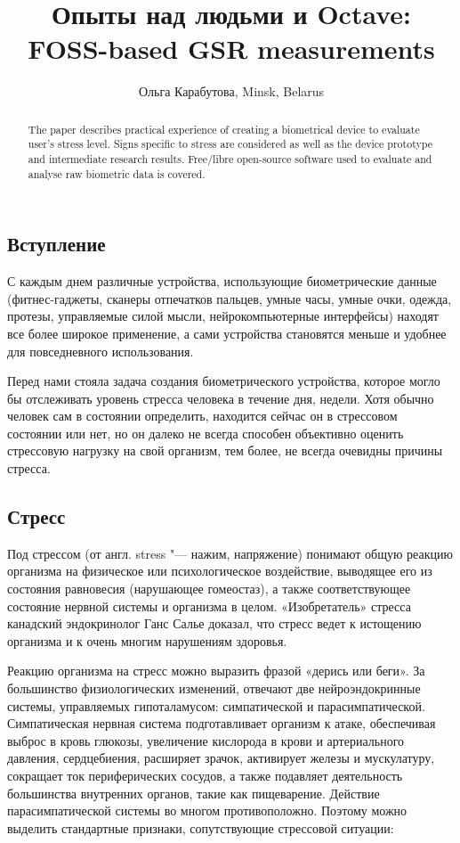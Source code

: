 \documentclass[10pt, a5paper]{article}
\begin{document}
\title{Опыты над людьми и Octave: FOSS-based GSR measurements}
\author{Ольга Карабутова, Minsk, Belarus}
\maketitle
\begin{abstract}
The paper describes practical experience of creating a biometrical device to evaluate user’s stress level. Signs specific to stress are considered as well as the device prototype and intermediate research results. Free/libre open-source software used to evaluate and analyse raw biometric data is covered.
\end{abstract}
\subsection*{Вступление}

С каждым днем различные устройства, использующие биометрические данные (фитнес-гаджеты, сканеры отпечатков пальцев, умные часы, умные очки, одежда, протезы, управляемые силой мысли, нейрокомпьютерные интерфейсы) находят все более широкое применение, а сами устройства становятся меньше и удобнее для повседневного использования.

Перед нами стояла задача  создания биометрического устройства, которое могло бы отслеживать уровень стресса  человека в течение дня, недели.  Хотя обычно человек сам в состоянии определить, находится сейчас он в стрессовом состоянии или нет, но он далеко не всегда способен объективно оценить стрессовую  нагрузку на свой организм, тем более, не всегда очевидны причины стресса.

\subsection*{Стресс}

Под стрессом (от англ. stress "--- нажим, напряжение) понимают общую реакцию организма на физическое или психологическое воздействие, выводящее его из состояния равновесия (нарушающее гомеостаз), а также соответствующее состояние нервной системы и организма в целом.
«Изобретатель» стресса канадский эндокринолог Ганс Салье доказал, что стресс ведет к истощению организма и к очень многим нарушениям здоровья.

Реакцию организма на стресс можно выразить фразой «дерись или беги». За большинство физиологических изменений, отвечают две нейроэндокринные системы, управляемых гипоталамусом: симпатической и парасимпатической. Симпатическая нервная система подготавливает организм к атаке, обеспечивая выброс в кровь глюкозы, увеличение кислорода в крови и артериального давления, сердцебиения, расширяет зрачок, активирует железы и мускулатуру, сокращает ток периферических сосудов, а также подавляет деятельность большинства внутренних органов, такие как пищеварение. Действие парасимпатической системы во многом противоположно. Поэтому можно выделить стандартные признаки, сопутствующие стрессовой ситуации:
\end{document}
